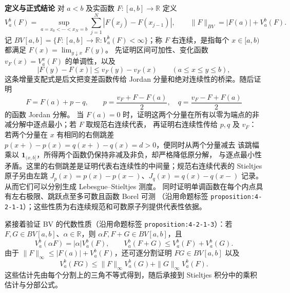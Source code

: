 \documentclass[11pt,a4paper]{ctexart}
\newcommand{\R}{\mathbb R}
\newcommand{\planitem}[1]{\par\smallskip\noindent\textcolor{deepblue}{\textbf{#1}}\quad}
\begin{document}
\planitem{定义与正式结论}
对 $a<b$ 及实函数 $F:[a,b]\to\R$ 定义
\[
V_a^b(F)=\sup_{a=x_0<\cdots<x_N=b}
\sum_{j=1}^N|F(x_j)-F(x_{j-1})|,
\qquad
\|F\|_{BV}=|F(a)|+V_a^b(F).
\]
记 $BV[a,b]=\{F:[a,b]\to\R:V_a^b(F)<\infty\}$；称 $F$ 右连续，是指每个
$x\in[a,b)$ 都满足 $F(x)=\lim_{y\downarrow x}F(y)$。
先证明区间可加性、变化函数 $v_F(x)=V_a^x(F)$ 的单调性，以及
\[
 |F(y)-F(x)|\le v_F(y)-v_F(x)\qquad(a\le x\le y\le b),
\]
这条增量支配式是后文把变差函数传给 Jordan 分量和绝对连续性的桥梁。随后证明
\[
F=F(a)+p-q,\qquad p=\frac{v_F+F-F(a)}2,
\quad q=\frac{v_F-F+F(a)}2
\]
的函数 Jordan 分解。
当 $F(a)=0$ 时，证明这两个分量在所有以零为端点的非减分解中逐点最小；若 $F$ 取规范右连续代表，
再证明右连续性传给 $p,q$ 及 $v_F$：若两个分量在 $x$ 有相同的右侧跳差
\(p(x+)-p(x)=q(x+)-q(x)=d>0\)，便同时从两个分量减去
该跳幅乘以 $\mathbf1_{(x,b]}$，所得两个函数仍保持非减及非负，却严格降低原分解，
与逐点最小性矛盾。这里的右侧跳差是证明代表右连续性的中间量；规范右连续代表的
Stieltjes 原子另由左跳 \(J_p(x)=p(x)-p(x-)\)、\(J_q(x)=q(x)-q(x-)\) 记录。
从而它们可以分别生成 Lebesgue--Stieltjes 测度。
同时证明单调函数在每个内点具有左右极限、跳跃点至多可数且函数 Borel 可测
（沿用命题标签 \texttt{proposition:4-2-1-1}）；这些性质为右连续规范和可数原子列提供代表性依据。

紧接着验证 BV 的代数性质（沿用命题标签
\texttt{proposition:4-2-1-3}）：若 $F,G\in BV[a,b]$、$\alpha\in\mathbb R$，则
$\alpha F,F+G\in BV[a,b]$，且
\[
 V_a^b(\alpha F)=|\alpha|V_a^b(F),\qquad
 V_a^b(F+G)\le V_a^b(F)+V_a^b(G).
\]
由于 $\|F\|_\infty\le |F(a)|+V_a^b(F)$，还可逐分割证明
$FG\in BV[a,b]$ 以及
\[
 V_a^b(FG)\le \|F\|_\infty V_a^b(G)+\|G\|_\infty V_a^b(F).
\]
这些估计先由每个分割上的三角不等式得到，随后承接到 Stieltjes 积分中的乘积估计与分部公式。
\end{document}
